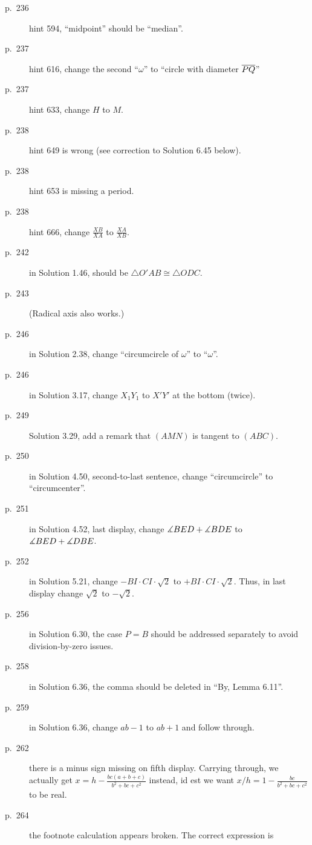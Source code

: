 \documentclass[11pt]{scrartcl}
\begin{document}
\begin{description}
\item[p.\  236] hint 594, ``midpoint'' should be ``median''.
\item[p.\  237] hint 616, change the second ``$\omega$'' to ``circle with diameter $\overline{PQ}$''
\item[p.\  237] hint 633, change $H$ to $M$.
\item[p.\  238] hint 649 is wrong (see correction to Solution 6.45 below).
\item[p.\  238] hint 653 is missing a period.
\item[p.\  238] hint 666, change $\frac{XB}{XA}$ to $\frac{XA}{XB}$.
\item[p.\  242] in Solution 1.46, should be $\triangle O'AB \cong \triangle ODC$.
\item[p.\  243] 
  (Radical axis also works.)
\item[p.\  246] in Solution 2.38, change ``circumcircle of $\omega$'' to ``$\omega$''.
\item[p.\  246] in Solution 3.17, change $X_1Y_1$ to $X'Y'$ at the bottom (twice).
\item[p.\  249] Solution 3.29, add a remark that $(AMN)$ is tangent to $(ABC)$.
\item[p.\  250] in Solution 4.50, second-to-last sentence,
  change ``circumcircle'' to ``circumcenter''.
\item[p.\  251] in Solution 4.52, last display,
  change $\measuredangle BED + \measuredangle BDE$ to $\measuredangle BED + \measuredangle DBE$.
\item[p.\  252] in Solution 5.21, change $-BI \cdot CI \cdot \sqrt2$ to $+ BI \cdot CI \cdot \sqrt2$.
  Thus, in last display change $\sqrt2$ to $-\sqrt2$.
\item[p.\  256] in Solution 6.30, the case $P=B$ should be addressed separately
  to avoid division-by-zero issues.
\item[p.\  258] in Solution 6.36, the comma should be deleted in ``By, Lemma 6.11''.
\item[p.\  259] in Solution 6.36, change $ab-1$ to $ab+1$ and follow through.
\item[p.\  262] there is a minus sign missing on fifth display.
  Carrying through, we actually get $x = h - \frac{bc(a+b+c)}{b^2+bc+c^2}$ instead,
  id est we want $x/h = 1 - \frac{bc}{b^2+bc+c^2}$ to be real.
\item[p.\  264] the footnote calculation appears broken. The correct expression is

\end{description}
\end{document}
